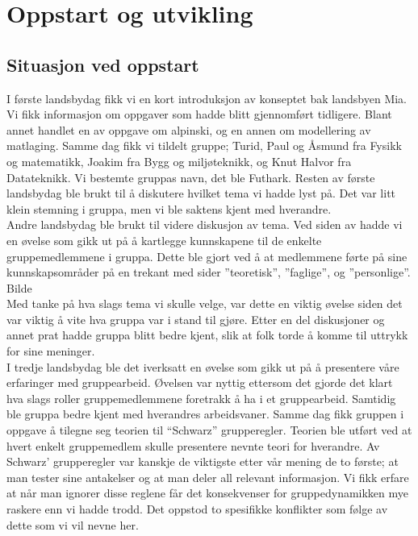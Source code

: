 
\chapter{Oppstart og utvikling}

\section{Situasjon ved oppstart}

I første landsbydag fikk vi en kort introduksjon av konseptet bak landsbyen Mia.
Vi fikk informasjon om oppgaver som hadde blitt gjennomført tidligere. Blant
annet handlet en av oppgave om alpinski, og en annen om modellering av
matlaging. Samme dag fikk vi tildelt gruppe; Turid, Paul og Åsmund fra Fysikk og
matematikk, Joakim fra Bygg og miljøteknikk, og Knut Halvor fra Datateknikk. Vi
bestemte gruppas navn, det ble Futhark. Resten av første landsbydag ble brukt
til å diskutere hvilket tema vi hadde lyst på. Det var litt klein stemning i
gruppa, men vi ble saktens kjent med hverandre. \\

Andre landsbydag ble brukt til videre diskusjon av tema. Ved siden av hadde vi
en øvelse som gikk ut på å kartlegge kunnskapene til de enkelte gruppemedlemmene
i gruppa. Dette ble gjort ved å at medlemmene førte på sine kunnskapsområder på
en trekant med sider ”teoretisk”, ”faglige”, og ”personlige”. Bilde\\

Med tanke på hva slags tema vi skulle velge, var dette en viktig øvelse siden
det var viktig å vite hva gruppa var i stand til gjøre. Etter en del diskusjoner
og annet prat hadde gruppa blitt bedre kjent, slik at folk torde å komme til
uttrykk for sine meninger. \\
 
I tredje landsbydag ble det iverksatt en øvelse som gikk ut på å presentere våre
erfaringer med gruppearbeid. Øvelsen var nyttig ettersom det gjorde det klart
hva slags roller gruppemedlemmene foretrakk å ha i et gruppearbeid. Samtidig ble
gruppa bedre kjent med hverandres arbeidsvaner. Samme dag fikk gruppen i oppgave
å tilegne seg teorien til ``Schwarz'' grupperegler. Teorien ble utført ved at
hvert enkelt gruppemedlem skulle presentere nevnte teori for hverandre. Av
Schwarz’ grupperegler var kanskje de viktigste etter vår mening de to første; at
man tester sine antakelser og at man deler all relevant informasjon.  Vi fikk
erfare at når man ignorer disse reglene får det konsekvenser for
gruppedynamikken mye raskere enn vi hadde trodd. Det oppstod to spesifikke
konflikter som følge av dette som vi vil nevne her.\\

